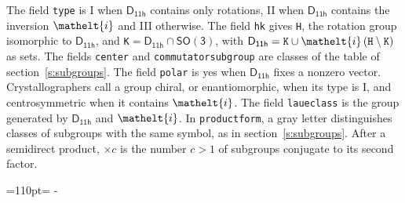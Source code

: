 \documentclass[10pt,a4paper]{article}
\newcommand{\needspace}[1]{\par\penalty-100\begingroup\dimen0=#1\relax\dimen2=\pagegoal
  \advance\dimen2-\pagetotal\ifdim\dimen0>\dimen2\relax\ifdim\dimen2>0pt\vfil\break\fi\fi
  \endgroup}
\numberwithin{equation}{section}
\newcommand{\eltfont}[1]{{\let\sigma\eltsigma\mathelt{#1}}}
\newcommand{\grp}[1]{\mathsf{#1}}
\newcommand{\elt}[1]{\eltfont{#1}}
\begin{document}
\leavevmode\label{n:element.inversion}The field \texttt{type} is I when $\grp{D_{11h}}$ contains only rotations, II when $\grp{D_{11h}}$ contains the inversion $\elt{i}$ and III otherwise. The field \texttt{hk} gives \texttt{H}, the rotation group isomorphic to $\grp{D_{11h}}$, and \texttt{K}${} = \grp{D_{11h}} \cap \grp{SO(3)}$, with $\grp{D_{11h}} = \texttt{K} \cup \elt{i}\,(\texttt{H} \setminus \texttt{K})$ as sets. The fields \texttt{center} and \texttt{commutatorsubgroup} are classes of the table of section~\ref{s:subgroups}. The field \texttt{polar} is yes when $\grp{D_{11h}}$ fixes a nonzero vector. Crystallographers call a group chiral, or enantiomorphic, when its type is I, and centrosymmetric when it contains $\elt{i}$. The field \texttt{laueclass} is the group generated by $\grp{D_{11h}}$ and $\elt{i}$.
In \texttt{productform}, a gray letter distinguishes classes of subgroups with the same symbol, as in section~\ref{s:subgroups}. \label{n:index.conjugates.c}After a semidirect product, ${\times}c$ is the number $c > 1$ of subgroups conjugate to its second factor.
\needspace{110pt}
\end{document}
